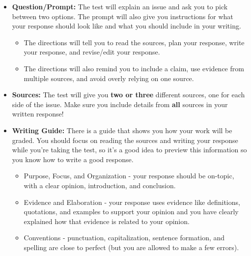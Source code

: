 \documentclass[12pt]{article}
\begin{document}
\vspace{1em}
\begin{tcolorbox}[colframe=black!60, colback=white, 
coltitle=black, colbacktitle=black!15, fonttitle=\bfseries\Large, 
title=What does the Writing Task Look Like?, halign title=center, left=10pt, right=10pt, top=10pt, bottom=15pt]

\begin{itemize}
    \item \textbf{Question/Prompt:} The test will explain an issue and ask you to pick between two options. The prompt will also give you instructions for what your response should look like and what you should include in your writing.
    \begin{itemize}
        \item The directions will tell you to read the sources, plan your response, write your response, and revise/edit your response.
        \item The directions will also remind you to include a claim, use evidence from multiple sources, and avoid overly relying on one source.
    \end{itemize}
    \item \textbf{Sources:} The test will give you \textbf{two or three} different sources, one for each side of the issue. Make sure you include details from \textbf{all} sources in your written response!
    \item \textbf{Writing Guide:} There is a guide that shows you how your work will be graded. You should focus on reading the sources and writing your response while you're taking the test, so it's a good idea to preview this information so you know how to write a good response.
    \begin{itemize}
        \item Purpose, Focus, and Organization - your response should be on-topic, with a clear opinion, introduction, and conclusion. 
        \item Evidence and Elaboration - your response uses evidence like definitions, quotations, and examples to support your opinion and you have clearly explained how that evidence is related to your opinion. 
        \item Conventions - punctuation, capitalization, sentence formation, and spelling are close to perfect (but you are allowed to make a few errors).
    \end{itemize}
    \end{itemize}






\end{tcolorbox}
\end{document}
